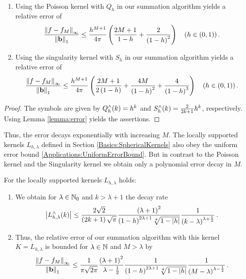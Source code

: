 \begin{lemma}${}^{}$\\[-3.5ex]
 \begin{enumerate}
   \item 
Using the Poisson kernel with $Q_h$ in our summation algorithm yields a relative 
error of
     \begin{equation}
       \label{error:poisson}
       \frac{\left\|f - f_{M}\right\|_{\infty}}{\left\|\mathbf{b}\right\|_1} \le
       \frac{h^{M+1}}{4\pi}
       \left(\frac{2M+1}{1-h}+\frac{2}{\left(1-h\right)^2}\right)\quad \left(h \in (0,1)\right).
     \end{equation}
     \item 
Using the singularity kernel with $S_h$ in our summation algorithm yields 
a relative error of
       \begin{equation}
         \label{error:singular}
         \frac{\left\|f - f_{M}\right\|_{\infty}}{\left\|\mathbf{b}\right\|_1} \le
         \frac{h^{M+1}}{4\pi} \left(\frac{2M+1}{2\left(1-h\right)}+
           \frac{4M}{\left(1-h\right)^2}+
         \frac{4}{\left(1-h\right)^3}\right)\quad \left(h \in (0,1)\right).
       \end{equation}
 \end{enumerate}
\end{lemma}
\begin{proof}
The symbols are given by $Q_{h}^{\wedge}{\hspace{-0.4ex}}\left(k\right)=h^k$ and
$S_{h}^{\wedge}{\hspace{-0.4ex}}\left(k\right)=\frac{2}{2k+1}h^k$, respectively.
Using Lemma \ref{lemma:error} yields the assertions.
\end{proof}
Thus, the error decays exponentially with increasing $M$.
The locally supported kernels $L_{h,\lambda}$ defined in Section 
\ref{Basics:SphericalKernels} also obey the uniform error bound
\eqref{Applications:UniformErrorBound}. But in contrast to the Poisson kernel 
and the Singularity kernel we obtain only a polynomial error decay in $M$.
\begin{lemma}
  For the locally supported kernels $L_{h,\lambda}$ holds:
  \begin{enumerate}
  \item We obtain for $\lambda \in \mathbb{N}_{0}$ and $k>\lambda+1$ the decay rate
    \[
    \left|L_{h,\lambda}^{\wedge}{\hspace{-0.4ex}}\left(k\right)\right| \le
    \frac{2\sqrt{2}}{\left(2k+1\right)\sqrt{\pi}}
    \frac{\left(\lambda+1\right)^2}{\left(1-h\right)^{2\lambda+1}\sqrt[4]{1-|h|}}
    \frac{1}{\left(k-\lambda\right)^{\lambda+\frac{1}{2}}}\,. 
    \]
  \item Thus, the relative error of our summation algorithm with this kernel
  $K=L_{h,\lambda}$ is bounded for $\lambda \in \mathbb{N}$ and $M>\lambda$ by
  \begin{equation}
    \label{error:Lh}
    \frac{\left\|f - f_{M}\right\|_{\infty}}{\left\|\mathbf{b}\right\|_1} \le
    \frac{1}{\pi\sqrt{2\pi}}
    \frac{\left(\lambda+1\right)^2}{\lambda-\frac{1}{2}}
    \frac{1}{\left(1-h\right)^{2\lambda+1}\sqrt[4]{1-|h|}}
    \frac{1}{\left(M-\lambda\right)^{\lambda-\frac{1}{2}}}\,.
  \end{equation}
  \end{enumerate}
\end{lemma}

